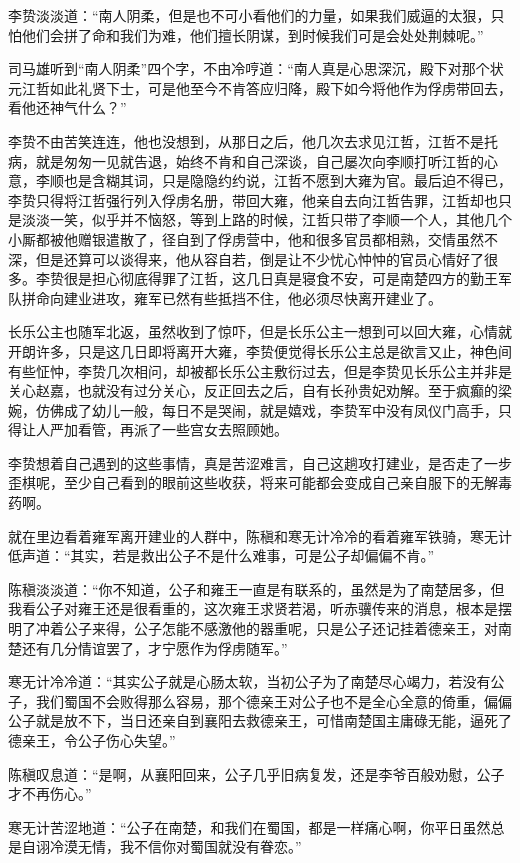 李贽淡淡道：“南人阴柔，但是也不可小看他们的力量，如果我们威逼的太狠，只怕他们会拼了命和我们为难，他们擅长阴谋，到时候我们可是会处处荆棘呢。”

司马雄听到“南人阴柔”四个字，不由冷哼道：“南人真是心思深沉，殿下对那个状元江哲如此礼贤下士，可是他至今不肯答应归降，殿下如今将他作为俘虏带回去，看他还神气什么？”

李贽不由苦笑连连，他也没想到，从那日之后，他几次去求见江哲，江哲不是托病，就是匆匆一见就告退，始终不肯和自己深谈，自己屡次向李顺打听江哲的心意，李顺也是含糊其词，只是隐隐约约说，江哲不愿到大雍为官。最后迫不得已，李贽只得将江哲强行列入俘虏名册，带回大雍，他亲自去向江哲告罪，江哲却也只是淡淡一笑，似乎并不恼怒，等到上路的时候，江哲只带了李顺一个人，其他几个小厮都被他赠银遣散了，径自到了俘虏营中，他和很多官员都相熟，交情虽然不深，但是还算可以谈得来，他从容自若，倒是让不少忧心忡忡的官员心情好了很多。李贽很是担心彻底得罪了江哲，这几日真是寝食不安，可是南楚四方的勤王军队拼命向建业进攻，雍军已然有些抵挡不住，他必须尽快离开建业了。

长乐公主也随军北返，虽然收到了惊吓，但是长乐公主一想到可以回大雍，心情就开朗许多，只是这几日即将离开大雍，李贽便觉得长乐公主总是欲言又止，神色间有些怔忡，李贽几次相问，却被都长乐公主敷衍过去，但是李贽见长乐公主并非是关心赵嘉，也就没有过分关心，反正回去之后，自有长孙贵妃劝解。至于疯癫的梁婉，仿佛成了幼儿一般，每日不是哭闹，就是嬉戏，李贽军中没有凤仪门高手，只得让人严加看管，再派了一些宫女去照顾她。

李贽想着自己遇到的这些事情，真是苦涩难言，自己这趟攻打建业，是否走了一步歪棋呢，至少自己看到的眼前这些收获，将来可能都会变成自己亲自服下的无解毒药啊。

就在里边看着雍军离开建业的人群中，陈稹和寒无计冷冷的看着雍军铁骑，寒无计低声道：“其实，若是救出公子不是什么难事，可是公子却偏偏不肯。”

陈稹淡淡道：“你不知道，公子和雍王一直是有联系的，虽然是为了南楚居多，但我看公子对雍王还是很看重的，这次雍王求贤若渴，听赤骥传来的消息，根本是摆明了冲着公子来得，公子怎能不感激他的器重呢，只是公子还记挂着德亲王，对南楚还有几分情谊罢了，才宁愿作为俘虏随军。”

寒无计冷冷道：“其实公子就是心肠太软，当初公子为了南楚尽心竭力，若没有公子，我们蜀国不会败得那么容易，那个德亲王对公子也不是全心全意的倚重，偏偏公子就是放不下，当日还亲自到襄阳去救德亲王，可惜南楚国主庸碌无能，逼死了德亲王，令公子伤心失望。”

陈稹叹息道：“是啊，从襄阳回来，公子几乎旧病复发，还是李爷百般劝慰，公子才不再伤心。”

寒无计苦涩地道：“公子在南楚，和我们在蜀国，都是一样痛心啊，你平日虽然总是自诩冷漠无情，我不信你对蜀国就没有眷恋。”

